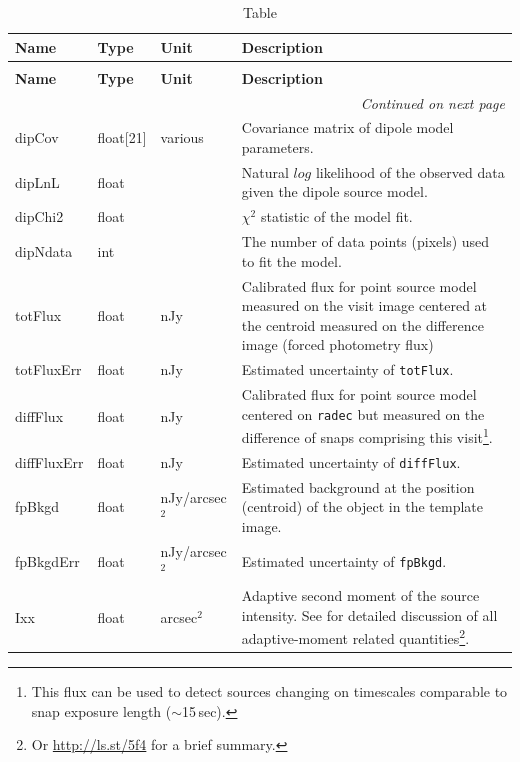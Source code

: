 \documentclass[SE,lsstdraft,toc]{lsstdoc}
\newenvironment{schema}[3]{%
\setlength\LTleft{0pt}
\setlength\LTright{\fill}
\begin{longtable}{p{0.2\textwidth}p{0.14\textwidth}p{0.14\textwidth}p{0.41\textwidth}}

\caption[#1]{#2\label{#3}}\\

\hline \textbf{Name} & \textbf{Type} & \textbf{Unit} & \textbf{Description}\\ \hline
\endfirsthead

\caption[#1]{#2}\\

\hline \textbf{Name} & \textbf{Type} & \textbf{Unit} & \textbf{Description}\\ \hline
\endhead

\hline \multicolumn{4}{r}{\emph{Continued on next page}} \\
\endfoot

\hline\hline
\endlastfoot
}{%
\hline
\end{longtable}
}
\begin{document}
\begin{schema}{\DIASource Table}{\DIASource Table}{tbl:diasourceTable}
dipCov & float[21] & various & Covariance matrix of dipole model parameters. \\

dipLnL & float & ~ & Natural $log$ likelihood of the observed data given the dipole source model. \\

dipChi2 & float & ~ & $\chi^2$ statistic of the model fit. \\

dipNdata & int & ~ & The number of data points (pixels) used to fit the model. \\

totFlux & float & nJy & Calibrated flux for point source model measured on the visit image centered at the centroid measured on the difference image (forced photometry flux) \\

totFluxErr & float & nJy & Estimated uncertainty of \texttt{totFlux}. \\

diffFlux & float & nJy & Calibrated flux for point source model centered on \texttt{radec} but measured on the difference of snaps comprising this visit\footnote{This flux can be used to detect sources changing on timescales comparable to snap exposure length ($\sim$15\,sec).}. \\

diffFluxErr & float & nJy & Estimated uncertainty of \texttt{diffFlux}. \\

fpBkgd & float & nJy/arcsec$^{2}$ & Estimated background at the position (centroid) of the object in
the template image. \\

fpBkgdErr & float & nJy/arcsec$^{2}$ & Estimated uncertainty of \texttt{fpBkgd}. \\



Ixx & float & arcsec$^{2}$  & Adaptive second moment of the source intensity. See \citet{2002AJ....123..583B} for detailed discussion of all adaptive-moment related quantities\footnote{Or \url{http://ls.st/5f4} for a brief summary.}. \\


\end{schema}
\end{document}
